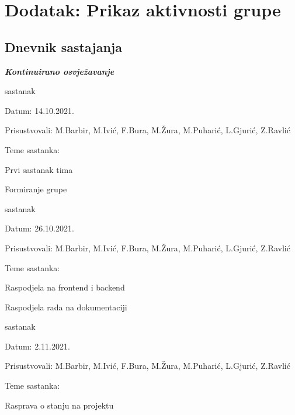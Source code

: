 \chapter*{Dodatak: Prikaz aktivnosti grupe}
		
		\section*{Dnevnik sastajanja}
		
		\textbf{\textit{Kontinuirano osvježavanje}}\\
		
		
		\begin{packed_enum}
				\item  sastanak
			
			\item[] \begin{packed_item}
				\item Datum: 14.10.2021.
				\item Prisustvovali: M.Barbir, M.Ivić, F.Bura, M.Žura, M.Puharić, L.Gjurić, Z.Ravlić
				\item Teme sastanka:
				\begin{packed_item}
					\item  Prvi sastanak tima
					\item  Formiranje grupe
				\end{packed_item}
			\end{packed_item}
			\item  sastanak
		
		\item[] \begin{packed_item}
			\item Datum: 26.10.2021.
			\item Prisustvovali: M.Barbir, M.Ivić, F.Bura, M.Žura, M.Puharić, L.Gjurić, Z.Ravlić
			\item Teme sastanka:
			\begin{packed_item}
				\item  Raspodjela na frontend i backend
				\item  Raspodjela rada na dokumentaciji
			\end{packed_item}
		\end{packed_item}
			\item  sastanak
			
			\item[] \begin{packed_item}
				\item Datum: 2.11.2021.
				\item Prisustvovali: M.Barbir, M.Ivić, F.Bura, M.Žura, M.Puharić, L.Gjurić, Z.Ravlić
				\item Teme sastanka:
				\begin{packed_item}
					\item  Rasprava o stanju na projektu
				\end{packed_item}
			\end{packed_item}
			

\end{packed_enum}
